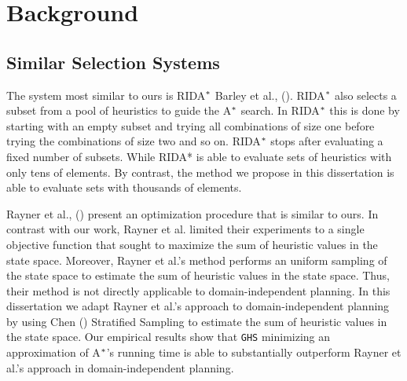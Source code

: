 
 
\chapter{Background}\label{ch:background}
\section{Similar Selection Systems}
\noindent
The system most similar to ours is RIDA$\sp{*}$ Barley et al., (\citeyear{BarleySantiagoOver}). RIDA$\sp{*}$ also selects a subset from a pool of heuristics to guide the A$\sp{*}$ search. In RIDA$\sp{*}$ this is done by starting with an empty subset and trying all combinations of size one before trying the combinations of size two and so on. RIDA$\sp{*}$ stops after evaluating a fixed number of subsets. While RIDA* is able to evaluate sets of heuristics with only tens of elements. By contrast, the method we propose in this dissertation is able to evaluate sets with thousands of elements.

Rayner et al., (\citeyear{raynersss13}) present an optimization procedure that is similar to ours. In contrast with our work, Rayner et al. limited their experiments to a single objective function that sought to maximize the sum of heuristic values in the state space. Moreover, Rayner et al.'s method performs an uniform sampling of the state space to estimate the sum of heuristic values in the state space. Thus, their method is not directly applicable to domain-independent planning. In this dissertation we adapt Rayner et al.'s approach to domain-independent planning by using Chen (\citeyear{chen1992heuristic}) Stratified Sampling to estimate the sum of heuristic values in the state space. Our empirical results show that \texttt{GHS} minimizing an approximation of A$\sp{*}$'s running time is able to substantially outperform Rayner et al.'s approach in domain-independent planning. 

